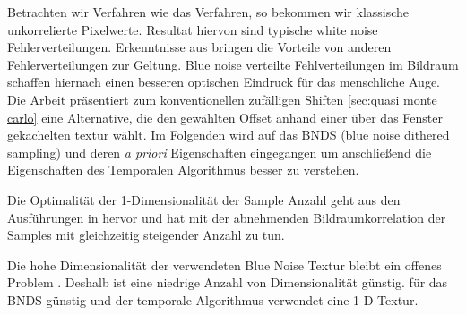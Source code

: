 Betrachten wir Verfahren wie das  Verfahren, 
so bekommen wir klassische unkorrelierte Pixelwerte. Resultat hiervon 
sind typische white noise Fehlerverteilungen. Erkenntnisse aus 
\cite{10.111712.152707} bringen die Vorteile von anderen Fehlerverteilungen
zur Geltung. Blue noise verteilte Fehlverteilungen im Bildraum schaffen hiernach 
einen besseren optischen Eindruck für das menschliche Auge. 
Die Arbeit \cite{georgiev2016blue} präsentiert zum konventionellen
zufälligen Shiften \ref{sec:quasi monte carlo} eine Alternative, die den 
gewählten Offset anhand einer über das Fenster gekachelten  
textur wählt. Im Folgenden wird auf das
BNDS (blue noise dithered sampling) und deren \textit{a priori} Eigenschaften 
eingegangen um anschließend die  Eigenschaften des 
Temporalen Algorithmus besser zu verstehen.

Die Optimalität der 1-Dimensionalität der Sample Anzahl geht aus den 
Ausführungen in \cite[S.3]{hal02158423} hervor und hat mit der 
abnehmenden Bildraumkorrelation der Samples mit gleichzeitig steigender
Anzahl zu tun.

Die hohe Dimensionalität der verwendeten Blue Noise Textur bleibt ein offenes 
Problem \cite{bluenoisechrisschied}. Deshalb ist eine niedrige Anzahl von 
Dimensionalität günstig.
für das BNDS günstig und der temporale Algorithmus verwendet eine 
1-D Textur. 

\label{alg:Grund für homogene Flächen}

